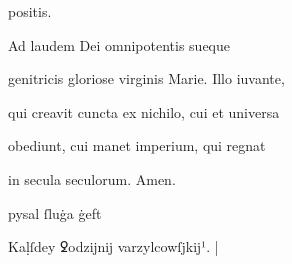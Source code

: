 positis.	

Ad laudem Dei omnipotentis sueque 

genitricis gloriose virginis Marie. Illo iuvante,

qui creavit cuncta ex nichilo, cui et universa 

obediunt, cui manet imperium, qui regnat 

in secula seculorum. Amen.


pysal ſluġa ġeft

Kaḷſdey ꝿodzĳnĳ varzylcowſjkĳ¹. |






\endinput




















\catcode `\^^M=5

  \newtip{48}{Łoś niesłusznie uważa, że \textit{bika} w obu wypadkach
    napisano błędnie zamiast \textit{ƀyka}. Przykłady są bowiem podane
    w~pisowni dotychczasowej dla pokazania jej niewystarczalności do
    zróżnicowania wyrazów \textit{bika} i \textit{byka}.} 

\obeylines






\newcommand{\margin}[1]{\annotatetextBlue{\{#1\}}{zapisy na marginesie}}



\renewcommand{\over}[1]{\annotatetextBlue{\{#1\}}{zapisy nad rządkami}}

\newcommand{\add}[1]{\annotatetextOlive{<#1>}{litery i wyrazy dodane, (których w tekście brak)}}

\newcommand{\extra}[1]{\colorbox{magenta!10}{[#1]}}

